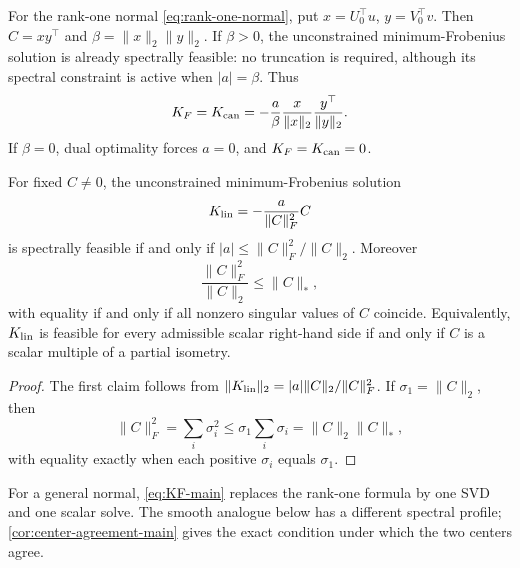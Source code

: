 For the rank-one normal \eqref{eq:rank-one-normal}, put
\(x=U_0^\top u\), \(y=V_0^\top v\).  Then
\(C=xy^\top\) and \(\beta=\|x\|_2\|y\|_2\).  If \(\beta>0\), the
unconstrained minimum-Frobenius solution is already spectrally feasible:
no truncation is required, although its spectral constraint is active when
\(|a|=\beta\).  Thus
\begin{equation}
 K_F=K_{\rm can}
 =-\frac{a}{\beta}
 \frac{x}{\|x\|_2}\frac{y^\top}{\|y\|_2}.
 \label{eq:Kcan-main}
\end{equation}
If \(\beta=0\), dual optimality forces \(a=0\), and
\(K_F=K_{\rm can}=0\).

\begin{proposition}
\label{prop:partial-isometry}
For fixed \(C\ne0\), the unconstrained minimum-Frobenius solution
\[
 K_{\rm lin}=-\frac{a}{\|C\|_F^2}C
\]
is spectrally feasible if and only if
\(|a|\le\|C\|_F^2/\|C\|_2\).  Moreover
\begin{equation}
 \frac{\|C\|_F^2}{\|C\|_2}\le\|C\|_*,
 \label{eq:pi-inequality}
\end{equation}
with equality if and only if all nonzero singular values of \(C\) coincide.
Equivalently, \(K_{\rm lin}\) is feasible for every admissible scalar
right-hand side if and only if \(C\) is a scalar multiple of a partial
isometry.
\end{proposition}

\begin{proof}
The first claim follows from
\(\|K_{\rm lin}\|_2=|a|\|C\|_2/\|C\|_F^2\).  If \(\sigma_1=\|C\|_2\), then
\[
 \|C\|_F^2=\sum_i\sigma_i^2
 \le\sigma_1\sum_i\sigma_i=\|C\|_2\|C\|_*,
\]
with equality exactly when each positive \(\sigma_i\) equals \(\sigma_1\).
\end{proof}

For a general normal, \eqref{eq:KF-main} replaces the rank-one formula by one
SVD and one scalar solve.  The smooth analogue below has a different spectral
profile; \cref{cor:center-agreement-main} gives the exact condition under
which the two centers agree.
